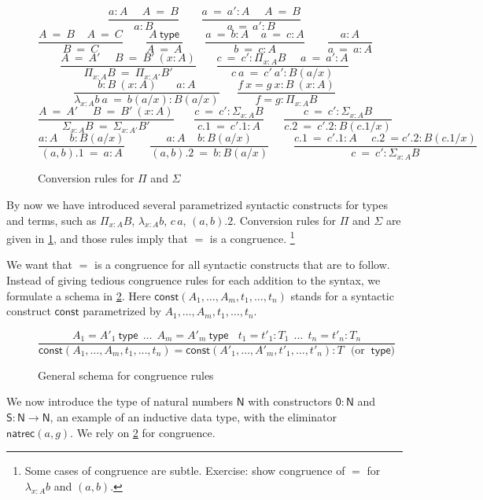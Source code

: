 \documentclass[11pt,a4paper]{article}
\theoremstyle{definition}
\newcommand{\conv}{=}
\newcommand{\NN}{\mathsf{N}}
\newcommand{\ZERO}{\mathsf{0}}
\newcommand{\SUCC}{\mathsf{S}}
\newcommand{\type}{\mathsf{type}}
\newcommand{\const}{\mathsf{const}}
\newcommand{\mypi}[3]{\Pi_{#1:#2}#3}
\newcommand{\mylam}[3]{\lambda_{#1:#2}#3}
\newcommand{\app}[2]{{#1\,#2}} %
\newcommand{\sapp}[2]{{#1(#2)}} %
\newcommand{\NRapp}[2]{\sapp{\natrec}{#1,#2}}
\newcommand{\mysig}[3]{\Sigma_{#1:#2}#3}
\newcommand{\natrec}{\mathsf{natrec}}
\begin{document}
\begin{figure}[h]
  \caption{Conversion rules for $\Pi$ and $\Sigma$}\label{fig:convPiSig}
$$
\frac{ a:A~~~~~~ A~ \conv~ B}{ a:B}~~~~~~~~~
\frac{ a ~\conv~a':A~~~~~~ A  ~\conv~ B}{ a ~\conv~a':B}
$$
$$
\frac{A~=~B~~~~~A~=~C}{B~=~C}~~~~~~~~~\frac{A~\type}{A~=~A}~~~~~~~~~
\frac{a~=~b:A~~~~~a~=~c:A}{b~=~c:A}~~~~~~~~~\frac{a:A}{a~=~a:A}
$$
$$
\frac{A~=~A'~~~~~~B~=~B'~(x:A)}{\mypi{x}{A}{B}~=~\mypi{x}{A'}{B'}}~~~~~~~~
\frac{c~=~c':\mypi{x}{A}{B}~~~~~~a~=~a':A}{c~a~=~c'~a':B(a/x)}
$$
$$
\frac{b:B~(x:A)~~~~~~~~ a:A}{ \mylam{x}{A}{b}~a  ~\conv~ b(a/x):B(a/x)}
~~~~~~~
\frac{f~x = g~x:B~(x:A)}{ f = g : \mypi{x}{A}{B}}
$$
$$
\frac{A~=~A'~~~~~~B~=~B'~(x:A)}{\mysig{x}{A}{B}~=~\mysig{x}{A'}{B'}}~~~~~~~~
\frac{c~=~c':\mysig{x}{A}{B}}{c.1~=~c'.1:A}~~~~~~~~
\frac{c~=~c':\mysig{x}{A}{B}}{c.2~=~c'.2:B(c.1/x)}~~~~~~~~
$$
$$
\frac{a:A~~~~~b:B(a/x)}{ (a,b).1 ~\conv~ a:A}~~~~~~~~~~
\frac{a:A~~~~~b:B(a/x)}{ (a,b).2 ~\conv~ b:B(a/x)}~~~~~~~~~~
\frac{c.1~=~ c'.1:A~~~~~~c.2~=c'.2:B(c.1/x)}{ c~=~ c' : \mysig{x}{A}{B}}
$$
\end{figure}

By now we have introduced several parametrized syntactic constructs
for types and terms, such as $\mypi{x}{A}{B}$,
$\mylam{x}{A}{b}$, $\app{c}{a}$, $(a,b).2$.
Conversion rules for $\Pi$ and $\Sigma$ are given in \cref{fig:convPiSig},
and those rules imply that $=$ is a congruence.%
\footnote{Some cases of congruence are subtle. Exercise:
show congruence of $=$ for $\mylam{x}{A}{b}$ and $(a,b)$.}

We want that $=$ is a congruence for all syntactic constructs
that are to follow.
Instead of giving tedious congruence rules for 
each addition to the syntax, we formulate a schema in \cref{fig:congr}.
Here $\const(A_1,\ldots,A_m,t_1,\ldots,t_n)$ stands for a syntactic 
construct $\const$ parametrized by $A_1,\ldots,A_m,t_1,\ldots,t_n$.

\begin{figure}[h!]
  \caption{General schema for congruence rules}\label{fig:congr}
$$
\frac{A_1 = A'_1~\type~~\ldots~~ A_m = A'_m~\type  ~~~~
t_1 = t'_1 : T_1 ~~\ldots~~  t_n = t'_n : T_n}
{\const(A_1,\ldots,A_m,t_1,\ldots,t_n) = 
\const(A'_1,\ldots,A'_m,t'_1,\ldots,t'_n) : T \text{~~(or $~\type$)}}
$$
\end{figure}

We now introduce the type of natural numbers $\NN$ with constructors 
$\ZERO:\NN$ and $\SUCC: \NN\to\NN$, an example of an
inductive data type, with the eliminator $\NRapp{a}{g}$. 
We rely on \cref{fig:congr} for congruence.
\end{document}
